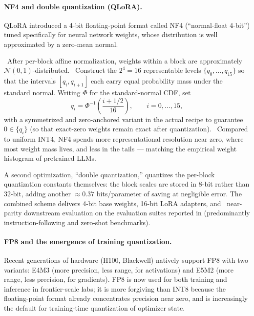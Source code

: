 \paragraph{\label{subsec:nf4}NF4 and double quantization (QLoRA).}
QLoRA \citep{dettmers2023qlora} introduced a 4-bit floating-point
format called NF4 (``normal-float 4-bit'') tuned specifically for
neural network weights, whose distribution is well approximated by
a zero-mean normal.

\begin{derivation}
\Assum\ After per-block affine normalization, weights within a block
are approximately $\mathcal{N}(0,1)$-distributed. \Def\ Construct the
$2^4 = 16$ representable levels $\{q_0, \dots, q_{15}\}$ so that the
intervals $[q_i, q_{i+1}]$ each carry equal probability mass under
the standard normal. Writing $\Phi$ for the standard-normal CDF, set
\[
  q_i = \Phi^{-1}\!\left(\frac{i + 1/2}{16}\right),
  \qquad i = 0,\dots,15,
\]
with a symmetrized and zero-anchored variant in the actual recipe to
guarantee $0 \in \{q_i\}$ (so that exact-zero weights remain exact
after quantization). \Cons\ Compared to uniform INT4, NF4 spends more
representational resolution near zero, where most weight mass lives,
and less in the tails --- matching the empirical weight histogram of
pretrained LLMs.
\end{derivation}

A second optimization, ``double quantization,'' quantizes the
per-block quantization constants themselves: the block scales are
stored in 8-bit rather than 32-bit, adding another $\approx 0.37$
bits/parameter of saving at negligible error. The combined scheme
delivers 4-bit base weights, 16-bit LoRA adapters, and \Emp\
near-parity downstream evaluation on the evaluation suites reported in
\citet{dettmers2023qlora} (predominantly instruction-following and
zero-shot benchmarks).

\paragraph{FP8 and the emergence of training quantization.}
Recent generations of hardware (H100, Blackwell) natively support
FP8 with two variants: E4M3 (more precision, less range, for
activations) and E5M2 (more range, less precision, for gradients).
FP8 is now used for both training and inference in frontier-scale
labs; it is more forgiving than INT8 because the floating-point
format already concentrates precision near zero, and is increasingly
the default for training-time quantization of optimizer state.

